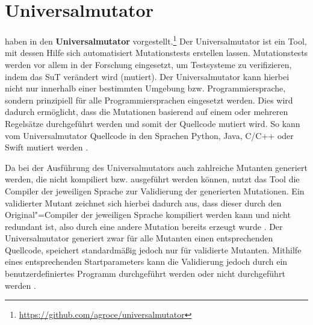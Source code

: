 \section{Universalmutator}
\label{sec:universalmutator}

\citeauthor{Groce2018} haben in \cite{Groce2018} den \textbf{Universalmutator} vorgestellt.\footnote{\url{https://github.com/agroce/universalmutator}} 
Der Universalmutator ist ein Tool, mit dessen Hilfe sich automatisiert Mutationstests erstellen lassen.
Mutationstests werden vor allem in der Forschung eingesetzt, um Testsysteme zu verifizieren, indem das \ac{SuT} verändert wird (mutiert).
Der Universalmutator kann hierbei nicht nur innerhalb einer bestimmten Umgebung bzw. Programmiersprache, sondern prinzipiell für alle Programmiersprachen eingesetzt werden.
Dies wird dadurch ermöglicht, dass die Mutationen basierend auf einem oder mehreren Regelsätze durchgeführt werden und somit der Quellcode mutiert wird.
So kann vom Universalmutator Quellcode \uA in den Sprachen Python, Java, C/C++ oder Swift mutiert werden \cite{Groce2018}.

Da bei der Ausführung des Universalmutators auch zahlreiche Mutanten generiert werden, die nicht kompiliert bzw. ausgeführt werden können, nutzt das Tool die Compiler der jeweiligen Sprache zur Validierung der generierten Mutationen.
Ein validierter Mutant zeichnet sich hierbei dadurch aus, dass dieser durch den Original"=Compiler der jeweiligen Sprache kompiliert werden kann und nicht redundant ist, also durch eine andere Mutation bereits erzeugt wurde \cite{Groce2018}.
Der Universalmutator generiert zwar für alle Mutanten einen entsprechenden Quellcode, speichert standardmäßig jedoch nur für validierte Mutanten.
Mithilfe eines entsprechenden Startparameters kann die Validierung jedoch durch ein benutzerdefiniertes Programm durchgeführt werden oder nicht durchgeführt werden \cite{Groce2018,UniversalmutatorSourceGenmutants}.
